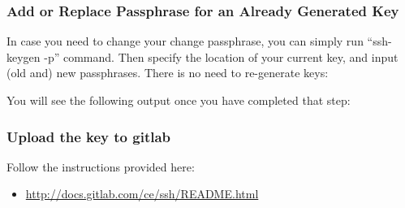\subsubsection{Add or Replace Passphrase for an Already Generated Key}
\label{\detokenize{lesson/linux/ssh:add-or-replace-passphrase-for-an-already-generated-key}}
In case you need to change your change passphrase, you can simply run
“ssh-keygen -p” command. Then specify the location of your current key,
and input (old and) new passphrases. There is no need to re-generate
keys:

\begin{sphinxVerbatim}[commandchars=\\\{\}]
 
\end{sphinxVerbatim}

You will see the following output once you have completed that step:

\begin{sphinxVerbatim}[commandchars=\\\{\}]
       
  
   
      
   
        
\end{sphinxVerbatim}


\subsubsection{Upload the key to gitlab}
\label{\detokenize{lesson/linux/ssh:upload-the-key-to-gitlab}}
Follow the instructions provided here:
\begin{itemize}
\item {} 
\url{http://docs.gitlab.com/ce/ssh/README.html}

\end{itemize}


